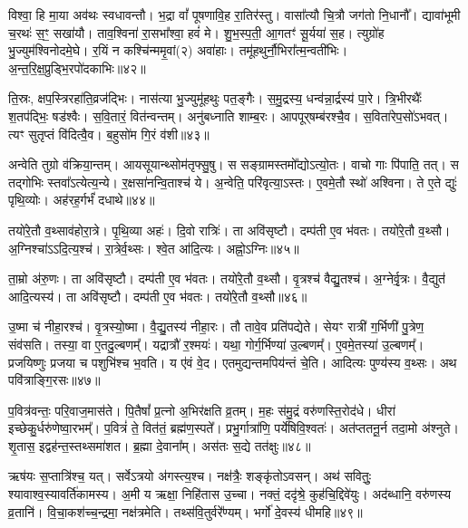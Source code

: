विश्वा॒ हि मा॒या अव॑थः स्वधावन्तौ। 
भ॒द्रा वां᳚ पूषणावि॒ह रा॒तिर॑स्तु। वासा᳚त्यौ चि॒त्रौ जग॑तो नि॒धानौ᳚। 
द्यावा॑भूमी च॒रथः॑ स॒ꣳ॒ सखा॑यौ। ताव॒श्विना॑ रा॒सभा᳚श्वा॒ हवं॑ मे। 
शु॒भ॒स्प॒ती॒ आ॒गतꣳ॑ सू॒र्यया॑ स॒ह। त्युग्रो॑ह भु॒ज्युम॑श्विनोदमे॒घे। 
र॒यिं न कश्चि॑न्ममृ॒वां(२) अवा॑हाः। तमू॑हथुर्नौ॒भिरा᳚त्म॒न्\-वती॑भिः। 
अ॒न्त॒रि॒क्ष॒प्रुड्भि॒रपो॑दकाभिः॥४२॥\ip


ति॒स्रः, क्षप॒स्त्रिरहा॑ति॒व्रज॑द्भिः। नास॑त्या भु॒ज्युमू॑हथुः पत॒ङ्गैः। 
स॒मु॒द्रस्य॒ धन्व॑न्ना॒र्द्रस्य॑ पा॒रे। त्रि॒भीरथैः᳚ श॒तप॑द्भिः॒ षड॑श्वैः। 
स॒वि॒तारं॒ वित॑न्वन्तम्। अनु॑बध्नाति शाम्ब॒रः। आपपूर्‌षम्ब॑रश्चै॒व। 
स॒विता॑\-रेप॒सो॑\-ऽभवत्। त्यꣳ सुतृप्तं वि॑दित्वै॒व। ब॒हुसो॑म गि॒रं व॑शी॥४३॥\ip

अन्वेति तुग्रो व॑क्रिया॒न्तम्। आयसूयान्थ्सोम॑तृफ्सु॒षु। स सङ्ग्राम\-स्तमो᳚द्यो\-ऽत्यो॒तः। 
वाचो गाः पि॑पाति॒ तत्। स तद्गोभिः स्तवा᳚\-ऽत्येत्य॒न्ये। र॒क्षसा॑नन्वि॒ताश्च॑ ये। 
अ॒न्वेति॒ परि॑वृत्या॒\-ऽस्तः। ए॒व\-मे॒तौ स्थो॑ अश्विना। 
ते ए॒ते द्युः॑ पृथि॒व्योः। अह॑रह॒र्गर्भं॑ दधाथे॥४४॥\ip

तयो॑रे॒तौ व॒थ्साव॑होरा॒त्रे। पृ॒थि॒व्या अहः॑। दि॒वो रात्रिः॑। 
ता अवि॑सृष्टौ। दम्प॑ती ए॒व भ॑वतः। तयो॑रे॒तौ व॒थ्सौ। 
अ॒ग्निश्चा॑\-ऽऽदि॒त्य॒श्च॑। रा॒त्रेर्व॒थ्सः। श्वे॒त आ॑दि॒त्यः। अह्नो॒\-ऽग्निः॥४५॥\ip

ता॒म्रो अ॑रु॒णः। ता अवि॑सृष्टौ। दम्प॑ती ए॒व भ॑वतः। 
तयो॑रे॒तौ व॒थ्सौ। वृ॒त्रश्च॑ वैद्यु॒तश्च॑। अ॒ग्नेर्वृ॒त्रः। वै॒द्युत॑ आदि॒त्यस्य॑। 
ता अवि॑सृष्टौ। दम्प॑ती ए॒व भ॑वतः। तयो॑रे॒तौ व॒थ्सौ॥४६॥\ip


उ॒ष्मा च॑ नीहा॒रश्च॑। वृ॒त्रस्यो॒ष्मा। वै॒द्यु॒तस्य॑ नीहा॒रः। 
तौ तावे॒व प्रति॑पद्येते। सेयꣳ रात्री॑ ग॒र्भिणी॑ पु॒त्रेण॒ संव॑सति। 
तस्या॒ वा ए॒तदु॒ल्बणम्‌᳚। यद्रात्रौ॑ र॒श्मयः॑। 
यथा॒ गोर्ग॒र्भिण्या॑ उ॒ल्बणम्‌᳚। ए॒वमे॒तस्या॑ उ॒ल्बणम्‌᳚। 
प्रजयिष्णुः प्रजया च पशुभि॑श्च भ॒वति। 
य ए॑वं वे॒द। एतमुद्यन्तमपिय॑न्तं चे॒ति। 
आदित्यः पुण्य॑स्य व॒थ्सः। अथ पवि॑त्राङ्गि॒रसः॥४७॥\ip\anuvakamend


प॒वित्र॑वन्तः॒ परि॒वाज॒मास॑ते। पि॒तैषां᳚ प्र॒त्नो अ॒भिर॑क्षति व्र॒तम्। 
म॒हः स॑मु॒द्रं वरु॑णस्ति॒रोद॑धे। धीरा॑ इच्छेकु॒र्धरु॑णेष्वा॒रभम्‌᳚। 
प॒वित्रं॑ ते॒ वित॑तं॒ ब्रह्म॑ण॒स्पते᳚। प्रभु॒र्गात्रा॑णि॒ पर्ये॑षिवि॒श्वतः॑। 
अत॑प्ततनू॒र्न तदा॒मो अ॑श्नुते। शृ॒तास॒ इद्वह॑न्त॒स्तथ्समा॑शत। 
ब्र॒ह्मा दे॒वाना᳚म्। अस॑तः स॒द्ये तत॑क्षुः॥४८॥\ip


ऋष॑यः स॒प्तात्रि॑श्च॒ यत्। सर्वे\-ऽत्रयो अ॑गस्त्य॒श्च। 
नक्ष॑त्रैः॒ शङ्कृ॑तो\-ऽवसन्। अथ॑ सवितुः॒ श्यावाश्व॒स्या\-वर्ति॑कामस्य। 
अ॒मी य ऋक्षा॒ निहि॑तास उ॒च्चा। नक्तं॒ ददृ॑श्रे॒ कुह॑चि॒द्दिवे॑युः। 
अद॑ब्धानि॒ वरु॑णस्य व्र॒तानि॑। वि॒चा॒कश॑च्च॒न्द्रमा॒ नक्ष॑त्रमेति। 
तथ्स॑वि॒तुर्वरे᳚ण्यम्। भर्गो॑ दे॒वस्य॑ धीमहि॥४९॥\ip


